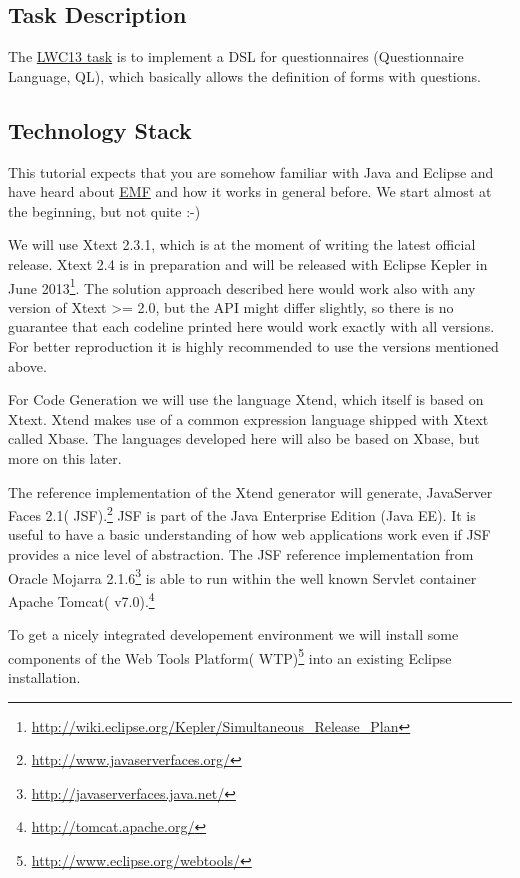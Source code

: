 \subsection{Task Description}
The {\href{http://www.languageworkbenches.net/images/5/53/Ql.pdf}{LWC13 task}}
is to implement a DSL for questionnaires (Questionnaire Language, QL), which
basically allows the definition of forms with questions.


\subsection{Technology Stack}
This tutorial expects that you are somehow familiar with Java and Eclipse and
have heard about \url{EMF} and how it works in general before. We start almost at the
beginning, but not quite :-) 

We will use Xtext 2.3.1, which is at the moment of writing the latest official
release.
Xtext 2.4 is in preparation and will be released with Eclipse Kepler in June
2013\footnote{\url{http://wiki.eclipse.org/Kepler/Simultaneous_Release_Plan}}.
The solution approach described here would work also with any version
of Xtext >= 2.0, but the API might differ slightly, so there is no guarantee
that each codeline printed here would work exactly with all versions. For better
reproduction it is highly recommended to use the versions mentioned above.

For Code Generation we will use the language Xtend, which itself is based on
Xtext. Xtend makes use of a common expression language shipped with Xtext called
Xbase. The languages developed here will also be based on Xbase, but more on
this later.

The reference implementation of the Xtend generator will generate, 
JavaServer Faces 2.1( JSF).\footnote{\url{http://www.javaserverfaces.org/}} 
JSF is part of the Java Enterprise Edition (Java EE). It is useful to have a 
basic understanding of how web applications work even if JSF provides a nice level 
of abstraction. The JSF reference implementation from 
Oracle Mojarra 2.1.6\footnote{\url{http://javaserverfaces.java.net/}} is able to run 
within the well known Servlet container Apache Tomcat( v7.0).\footnote{\url{http://tomcat.apache.org/}} 

To get a nicely integrated developement environment we will install some components of the
Web Tools Platform( WTP)\footnote{\url{http://www.eclipse.org/webtools/}} into an existing Eclipse installation.